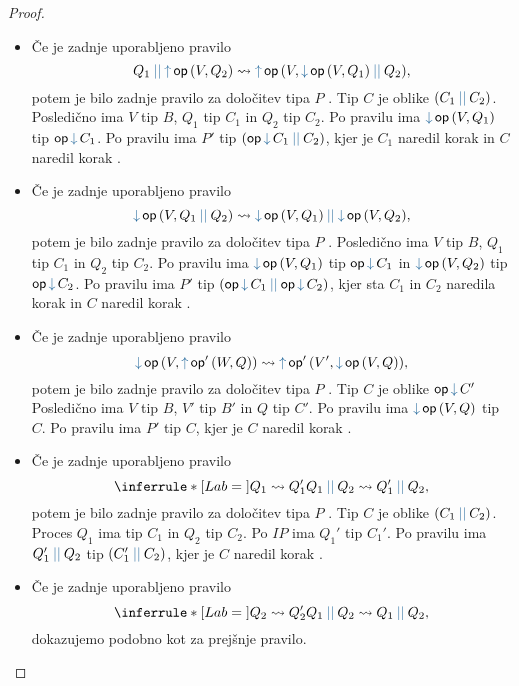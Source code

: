 \begin{proof}
\begin{itemize}
		\item Če je zadnje uporabljeno pravilo
		$$\tmpar{Q_1}{\tmopout{op}{V}{Q_2}} \reduces \tmopout{op}{V}{\tmpar{\tmopin{op}{V}{Q_1}}{Q_2}},$$
		potem je bilo zadnje pravilo za določitev tipa $P$ . Tip $C$ je oblike $\typar{C_1}{C_2}$.
		Posledično ima $V$ tip $B$, $Q_1$ tip $C_1$ in $Q_2$ tip $C_2$.
		Po pravilu  ima $\tmopin{op}{V}{Q_1}$ tip $\opincomp{op}{C_1}$.
		Po pravilu  ima $P'$ tip $\typar{\opincomp{op}{C_1}}{C_2}$, kjer je $C_1$ naredil korak  in $C$ naredil korak .
	
		\item Če je zadnje uporabljeno pravilo
		$$\tmopin{op}{V}{\tmpar{Q_1}{Q_2}} \reduces \tmpar {\tmopin{op}{V}{Q_1}} {\tmopin{op}{V}{Q_2}},$$
		potem je bilo zadnje pravilo za določitev tipa $P$ .
		Posledično ima $V$ tip $B$, $Q_1$ tip $C_1$ in $Q_2$ tip $C_2$.
		Po pravilu  ima $\tmopin{op}{V}{Q_1}$ tip $\opincomp{op}{C_1}$ in $\tmopin{op}{V}{Q_2}$ tip $\opincomp{op}{C_2}$.
		Po pravilu  ima $P'$ tip $\typar{\opincomp{op}{C_1}}{\opincomp{op}{C_2}}$, kjer sta $C_1$ in $C_2$ naredila korak  in $C$ naredil korak .
		
		\item Če je zadnje uporabljeno pravilo
		$$\tmopin{op}{V}{\tmopout{op'}{W}{Q}} \reduces \tmopout{op'}{V'}{\tmopin{op}{V}{Q}},$$
		potem je bilo zadnje pravilo za določitev tipa $P$ . Tip $C$ je oblike $\opincomp{op}{C'}$
		Posledično ima $V$ tip $B$, $V'$ tip $B'$ in $Q$ tip $C'$.
		Po pravilu  ima $\tmopin{op}{V}{Q}$ tip $C$.
		Po pravilu  ima $P'$ tip $C$, kjer je $C$ naredil korak .
		
		\item Če je zadnje uporabljeno pravilo
		$$
		\coopinfer{}{
			Q_1 \reduces Q_1'
		}{
			\tmpar{Q_1}{Q_2}  \reduces \tmpar{Q_1'}{Q_2}
		},$$
		potem je bilo zadnje pravilo za določitev tipa $P$ . Tip $C$ je oblike $\typar{C_1}{C_2}$.
		Proces $Q_1$ ima tip $C_1$ in $Q_2$ tip $C_2$.
		Po $IP$ ima $Q_1'$ tip $C_1'$.
		Po pravilu  ima $\tmpar{Q_1'}{Q_2}$ tip $\typar{C_1'}{C_2}$, kjer je $C$ naredil korak .

		\item Če je zadnje uporabljeno pravilo
		$$
		\coopinfer{}{
			Q_2 \reduces Q_2'
		}{
			\tmpar{Q_1}{Q_2}  \reduces \tmpar{Q_1}{Q_2}
		},$$
		dokazujemo podobno kot za prejšnje pravilo.
		

\end{itemize}
\end{proof}

